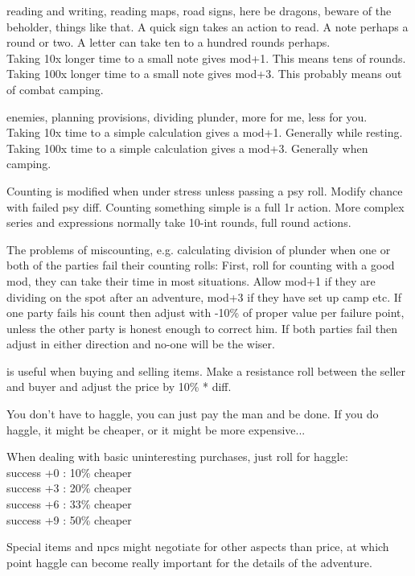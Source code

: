  reading and writing, reading maps, road signs, here be dragons, beware of the beholder, things like that. A quick sign takes an action to read. A note perhaps a round or two. A letter can take ten to a hundred rounds perhaps. \\
Taking 10x longer time to a small note gives mod+1. This means tens of rounds. \\
Taking 100x longer time to a small note gives mod+3. This probably means out of combat camping.


 enemies, planning provisions, dividing plunder, more for me, less for you. \\
Taking 10x time to a simple calculation gives a mod+1. Generally while resting. \\
Taking 100x time to a simple calculation gives a mod+3. Generally when camping.

Counting is modified when under stress unless passing a psy roll. Modify chance with failed psy diff. Counting something simple is a full 1r action. More complex series and expressions normally take 10-int rounds, full round actions.

The problems of miscounting, e.g. calculating division of plunder when one or both of the parties fail their counting rolls: First, roll for counting with a good mod, they can take their time in most situations. Allow mod+1 if they are dividing on the spot after an adventure, mod+3 if they have set up camp etc.
If one party fails his count then adjust with -10\% of proper value per failure point, unless the other party is honest enough to correct him. If both parties fail then adjust in either direction and no-one will be the wiser.


 is useful when buying and selling items. Make a resistance roll between the seller and buyer and adjust the price by 10\% * diff.

You don't have to haggle, you can just pay the man and be done. If you do haggle, it might be cheaper, or it might be more expensive...

When dealing with basic uninteresting purchases, just roll for haggle: \\
success +0 : 10\% cheaper \\
success +3 : 20\% cheaper \\
success +6 : 33\% cheaper \\
success +9 : 50\% cheaper

Special items and npcs might negotiate for other aspects than price, at which point haggle can become really important for the details of the adventure.


